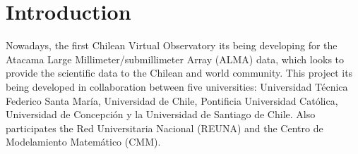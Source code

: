 \section{Introduction}


Nowadays, the first Chilean Virtual Observatory its being developing for the
Atacama Large Millimeter/submillimeter Array (ALMA) data, which looks to
provide the scientific data to the Chilean and world community. This project
its being developed in collaboration between five universities: Universidad
Técnica Federico Santa María, Universidad de Chile, Pontificia Universidad
Católica, Universidad de Concepción y la Universidad de Santiago de Chile.
Also participates the Red Universitaria Nacional (REUNA) and the Centro de
Modelamiento Matemático (CMM).

